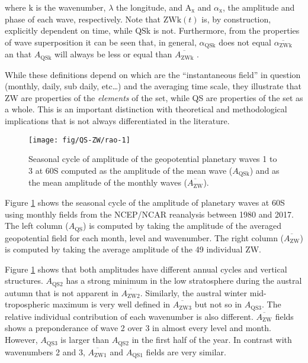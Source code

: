 \documentclass[draft,linenumbers]{agujournal2018}
\begin{document}
where \(\mathrm{k}\) is the wavenumber, \(\lambda\) the longitude, and
\(\mathrm{A_{x}}\) and \(\alpha_\mathrm{x}\), the amplitude and phase of
each wave, respectively. Note that \(\mathrm{ZWk}(t)\) is, by
construction, explicitly dependent on time, while \(\mathrm{QSk}\) is
not. Furthermore, from the properties of wave superposition it can be
seen that, in general, \(\alpha_\mathrm{QSk}\) does not equal
\(\overline{\alpha_\mathrm{ZWk}}\) an that \(A_\mathrm{QSk}\) will
always be less or equal than \(\overline{A_\mathrm{ZWk}}\)
\citep{Pain2005}.

While these definitions depend on which are the ``instantaneous field''
in question (monthly, daily, sub daily, etc\ldots{}) and the averaging
time scale, they illustrate that ZW are properties of the
\emph{elements} of the set, while QS are properties of the set as a
whole. This is an important distinction with theoretical and
methodological implications that is not always differentiated in the
literature.

\begin{figure}[h]

{\centering \texttt{[image: fig/QS-ZW/rao-1]} 

}

\caption{Seasonal cycle of amplitude of the geopotential planetary waves 1 to 3 at 60\degree S computed as the amplitude of the mean wave ($A_\mathrm{QSk}$) and as the mean amplitude of the monthly waves ($\overline{A_\mathrm{ZW} }$).}\label{fig:rao}
\end{figure}

Figure \ref{fig:rao} shows the seasonal cycle of the amplitude of
planetary waves at 60\degree S using monthly fields from the NCEP/NCAR
reanalysis \citep{Kalnay1996} between 1980 and 2017. The left column
(\(A_\mathrm{QS}\)) is computed by taking the amplitude of the averaged
geopotential field for each month, level and wavenumber. The right
column (\(\overline{A_\mathrm{ZW}}\)) is computed by taking the average
amplitude of the 49 individual ZW.

Figure \ref{fig:rao} shows that both amplitudes have different annual
cycles and vertical structures. \(A_\mathrm{QS2}\) has a strong minimum
in the low stratosphere during the austral autumn that is not apparent
in \(\overline{A_\mathrm{ZW2}}\). Similarly, the austral winter
mid-tropospheric maximum is very well defined in
\(\overline{A_\mathrm{ZW3}}\) but not so in \(A_\mathrm{QS3}\). The
relative individual contribution of each wavenumber is also different.
\(\overline{A_\mathrm{ZW}}\) fields shows a preponderance of wave 2 over
3 in almost every level and month. However, \(A_\mathrm{QS3}\) is larger
than \(A_\mathrm{QS2}\) in the first half of the year. In contrast with
wavenumbers 2 and 3, \(\overline{A_\mathrm{ZW1}}\) and
\(A_\mathrm{QS1}\) fields are very similar.
\end{document}
